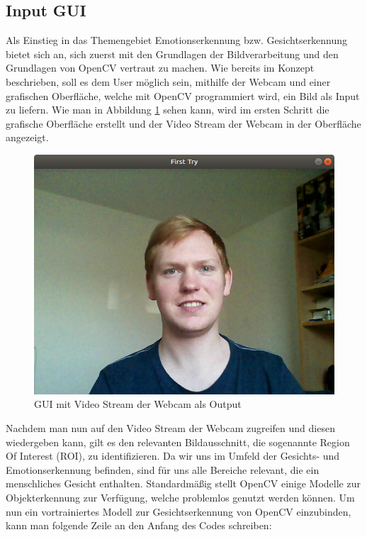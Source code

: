 \documentclass[12pt, a4paper]{scrbook}
\begin{document}
\subsection{Input GUI}
Als Einstieg in das Themengebiet Emotionserkennung bzw. Gesichtserkennung bietet sich an, sich zuerst mit den Grundlagen der Bildverarbeitung und den Grundlagen von OpenCV vertraut zu machen. Wie bereits im Konzept beschrieben, soll es dem User möglich sein, mithilfe der Webcam und einer grafischen Oberfläche, welche mit OpenCV programmiert wird, ein Bild als Input zu liefern. Wie man in Abbildung \ref{fig:Input GUI 1} sehen kann, wird im ersten Schritt die grafische Oberfläche erstellt und der Video Stream der Webcam in der Oberfläche angezeigt.

\begin{figure}[h]
\includegraphics[width=\linewidth]{Bilder/InputGUI1.png}
\caption{GUI mit Video Stream der Webcam als Output}
\label{fig:Input GUI 1}
\end{figure}
Nachdem man nun auf den Video Stream der Webcam zugreifen und diesen wiedergeben kann, gilt es den relevanten Bildausschnitt, die sogenannte Region Of Interest (ROI), zu identifizieren. Da wir uns im Umfeld der Gesichts- und Emotionserkennung befinden, sind für uns alle Bereiche relevant, die ein menschliches Gesicht enthalten. Standardmäßig stellt OpenCV einige Modelle zur Objekterkennung zur Verfügung, welche problemlos genutzt werden können. Um nun ein vortrainiertes Modell zur Gesichtserkennung von OpenCV einzubinden, kann man folgende Zeile an den Anfang des Codes schreiben:\newline
\end{document}
